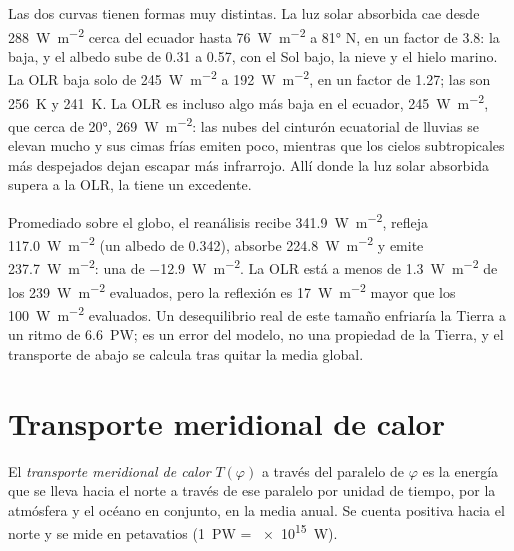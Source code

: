Las dos curvas tienen formas muy distintas. La luz solar absorbida cae desde \qty{288}{W.m^{-2}} cerca del ecuador hasta \qty{76}{W.m^{-2}} a \ang{81} N, en un factor de \num{3.8}: la  baja, y el albedo sube de \num{0.31} a \num{0.57}, con el Sol bajo, la nieve y el hielo marino. La OLR baja solo de \qty{245}{W.m^{-2}} a \qty{192}{W.m^{-2}}, en un factor de \num{1.27}; las  son \qty{256}{K} y \qty{241}{K}. La OLR es incluso algo más baja en el ecuador, \qty{245}{W.m^{-2}}, que cerca de \ang{20}, \qty{269}{W.m^{-2}}: las nubes del cinturón ecuatorial de lluvias se elevan mucho y sus cimas frías emiten poco, mientras que los cielos subtropicales más despejados dejan escapar más infrarrojo. Allí donde la luz solar absorbida supera a la OLR, la  tiene un excedente.

\begin{example}\label{ex:b1:radiation-heat-transport:global}
Promediado sobre el globo, el reanálisis recibe \qty{341.9}{W.m^{-2}}, refleja
\qty{117.0}{W.m^{-2}} (un albedo de \num{0.342}), absorbe \qty{224.8}{W.m^{-2}} y
emite \qty{237.7}{W.m^{-2}}: una  de \qty{-12.9}{W.m^{-2}}. La OLR está
a menos de \qty{1.3}{W.m^{-2}} de los \qty{239}{W.m^{-2}} evaluados, pero la reflexión es \qty{17}{W.m^{-2}} mayor que los \qty{100}{W.m^{-2}} evaluados. Un desequilibrio real de este tamaño enfriaría la Tierra a un ritmo de \qty{6.6}{PW}; es un error del modelo, no una propiedad de la Tierra, y el transporte de abajo se calcula tras quitar la media global.
\end{example}

\section{Transporte meridional de calor}\label{sec:b1:radiation-heat-transport:transport}

\begin{definition}\label{def:b1:radiation-heat-transport:mht}
El \emph{transporte meridional de calor} $T(\varphi)$
a través del paralelo de  $\varphi$ es la energía que se lleva hacia el norte a través de ese paralelo por unidad de tiempo, por la atmósfera y el océano en conjunto, en la media anual. Se cuenta positiva hacia el norte y se mide en petavatios
(\qty{1}{PW} = \qty{e15}{W}).
\end{definition}

